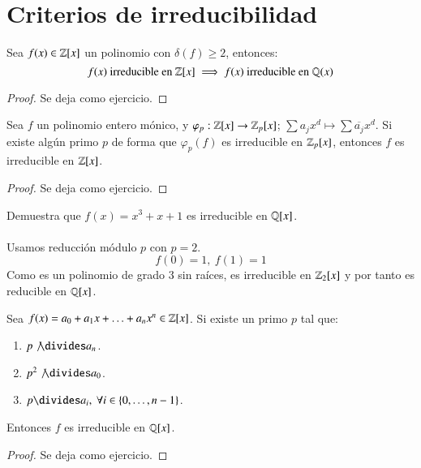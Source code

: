 \section{Criterios de irreducibilidad}

\begin{lm}[de Gauss]
    Sea $f(x) \in \mathbb{Z}[x]$ un polinomio con $\delta(f) \geq 2$, entonces:
    $$
        f(x) \text{ irreducible en } \mathbb{Z}[x] \implies f(x) \text{ irreducible en } \mathbb{Q}(x)
    $$
\end{lm}
\begin{proof}
    Se deja como ejercicio.
\end{proof}


\begin{lm}
    Sea $f$ un polinomio entero mónico, y $\varphi_p: \mathbb{Z}[x] \to \mathbb{Z}_p[x]$; $\sum a_jx^d \mapsto \sum \overline{a_j}x^d$. Si existe algún primo $p$ de forma que $\varphi_p(f)$ es irreducible en $\mathbb{Z}_p[x]$, entonces $f$ es irreducible en $\mathbb{Z}[x]$.
\end{lm}
\begin{proof}
    Se deja como ejercicio.
\end{proof}

\begin{ex}[H1.34 (c)]
    Demuestra que $f(x) = x^3+x+1$ es irreducible en $\mathbb{Q}[x]$.\\\\
    Usamos reducción módulo $p$ con $p = 2$.
    $$
        f(0) = 1,\ f(1) = 1
    $$
    Como es un polinomio de grado $3$ sin raíces, es irreducible en $\mathbb{Z}_2[x]$ y por tanto es reducible en $\mathbb{Q}[x]$.
\end{ex}

\begin{thm}\label{thm:Einsestein}
    Sea $f(x) = a_0 + a_1 x + \ldots + a_n x^n \in \mathbb{Z}[x]$. Si existe un primo $p$ tal que:
    \begin{enumerate}
        \item $p \not \divides a_n$.
        \item $p^2 \not \divides a_0$.
        \item $p \divides a_i,\ \forall i \in \setdef{0, \ldots, n-1} $.
    \end{enumerate}
    Entonces $f$ es irreducible en $\mathbb{Q}[x]$.
\end{thm}
\begin{proof}
    Se deja como ejercicio.
\end{proof}

